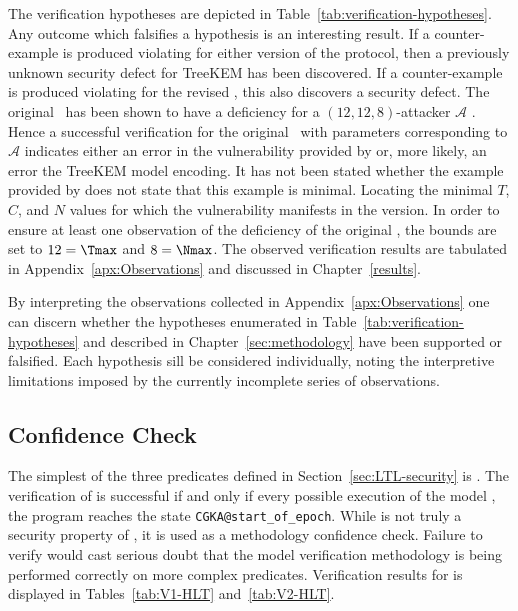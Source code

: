 The verification hypotheses are depicted in Table\ \ref{tab:verification-hypotheses}.
Any outcome which falsifies a hypothesis is an interesting result.
If a counter-example is produced violating  for either version of the protocol, then a previously unknown security defect for TreeKEM has been discovered.
If a counter-example is produced violating  for the revised \VersionTwo, this also discovers a security defect.
The original \VersionOne\ has been shown to have a  deficiency for a \((12, 12, 8)\)-attacker \(\mathcal{A}\) \autocite{alwen2020security}.
Hence a successful  verification for the original \VersionOne\ with parameters corresponding to \(\mathcal{A}\) indicates either an error in the vulnerability provided by \autocite{alwen2020security} or, more likely, an error the TreeKEM model encoding.
It has not been stated whether the example provided by \autocite{alwen2020security} does not state that this example is minimal.
Locating the minimal \(T\), \(C\), and \(N\) values for which the vulnerability manifests in the \VersionOne version.
In order to ensure at least one observation of the  deficiency of the original \VersionOne, the bounds are set to \(12 = \Tmax\) and \(8 = \Nmax\).
The observed verification results are tabulated in Appendix\ \ref{apx:Observations} and discussed in Chapter\ \ref{results}.

By interpreting the observations collected in Appendix\ \ref{apx:Observations} one can discern whether the hypotheses enumerated in Table\ \ref{tab:verification-hypotheses} and described in Chapter\ \ref{sec:methodology} have been supported or falsified.
Each hypothesis sill be considered individually, noting the interpretive limitations imposed by the currently incomplete series of observations.


\hypertarget{sec:confidence-check}{%
\subsection{Confidence Check}\label{sec:confidence-check}}

The simplest of the three  predicates defined in Section\ \ref{sec:LTL-security} is .
The verification of  is successful if and only if every possible execution of the model \CGKAmod{}{}{}, the program reaches the state \texttt{CGKA@start\_of\_epoch}.
While  is not truly a security property of \CGKAmod{}{}{}, it is used as a methodology confidence check.
Failure to verify  would cast serious doubt that the model verification methodology is being performed correctly on more complex  predicates.
Verification results for  is displayed in Tables\ \ref{tab:V1-HLT} and\ \ref{tab:V2-HLT}.

